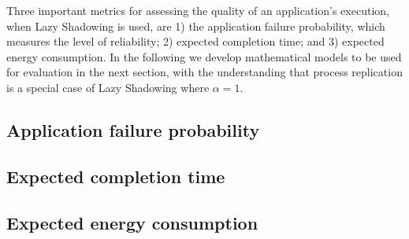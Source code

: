 Three important metrics for assessing the quality of an application's execution, when Lazy Shadowing is used, are 1) the application failure probability, which measures the level of reliability; 2) expected completion time; and 3) expected energy consumption. In the following we develop mathematical models to be used for evaluation in the next section, with the understanding
that process replication is a special case of Lazy Shadowing where $\alpha=1$. 



\subsection{Application failure probability}
\label{anal_app_fail}


\subsection{Expected completion time}
\label{anal_time}


\subsection{Expected energy consumption}
\label{anal_energy}

